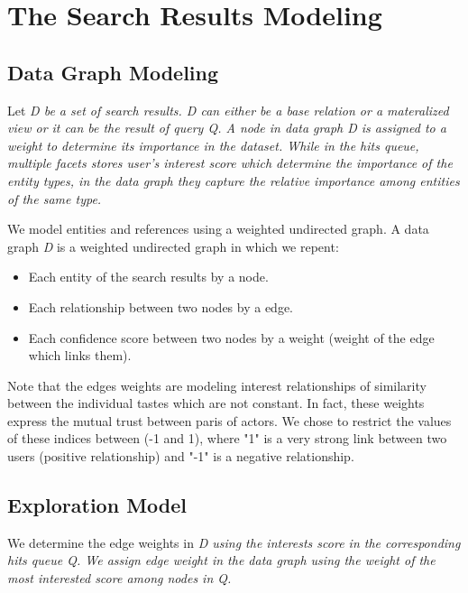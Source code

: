 \chapter{The Search Results Modeling}

\section{Data Graph Modeling}

Let \it{D} be a set of search results. D can either be a base relation or a materalized view or it can be the result of query \it{Q}. A node in data graph D is assigned to a weight to determine its importance in the dataset. While in the hits queue, multiple facets stores user's interest score which determine the importance of the entity types, in the data graph they capture the relative importance among entities of the same type. 

We model entities and references using a weighted undirected graph. A data graph {\it D} is a weighted undirected graph in which we repent:
\begin{itemize}
	\item Each entity of the search results by a node.
	\item Each relationship between two nodes by a edge.
	\item Each confidence score between two nodes by a weight (weight of the edge which links them).
\end{itemize}
Note that the edges weights are modeling interest relationships of similarity between the individual tastes which are not constant. In fact, these weights express the mutual trust between paris of actors. We chose to restrict the values of these indices between (-1 and 1), where "1" is a very strong link between two users (positive relationship) and "-1" is a negative relationship.

\section{Exploration Model}

We determine the edge weights in \it{D} using the interests score in the corresponding hits queue \it{Q}. We assign edge weight in the data graph using the weight of the most interested score among nodes in \it{Q}.
